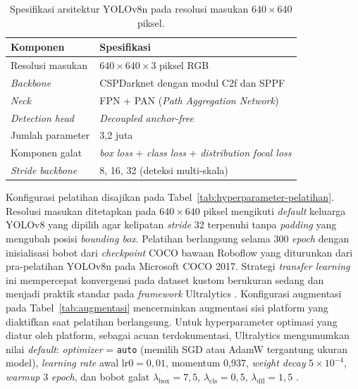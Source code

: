 \begin{table}[H]
\centering
\caption{Spesifikasi arsitektur YOLOv8n pada resolusi masukan $640 \times 640$ piksel.}
\label{tab:arsitektur-yolov8n}
\begin{tabular}{ll}
\hline
\textbf{Komponen} & \textbf{Spesifikasi} \\
\hline
Resolusi masukan       & $640 \times 640 \times 3$ piksel RGB \\
\textit{Backbone}      & CSPDarknet dengan modul C2f dan SPPF \\
\textit{Neck}          & FPN + PAN (\textit{Path Aggregation Network}) \\
\textit{Detection head} & \textit{Decoupled anchor-free} \\
Jumlah parameter       & 3,2 juta \\
Komponen galat         & \textit{box loss} + \textit{class loss} + \textit{distribution focal loss} \\
\textit{Stride backbone} & 8, 16, 32 (deteksi multi-skala) \\
\hline
\end{tabular}
\end{table}


Konfigurasi pelatihan disajikan pada Tabel~\ref{tab:hyperparameter-pelatihan}. Resolusi masukan ditetapkan pada $640 \times 640$ piksel mengikuti \textit{default} keluarga YOLOv8 yang dipilih agar kelipatan \textit{stride} 32 terpenuhi tanpa \textit{padding} yang mengubah posisi \textit{bounding box}. Pelatihan berlangsung selama 300 \textit{epoch} dengan inisialisasi bobot dari \textit{checkpoint} COCO bawaan Roboflow yang diturunkan dari pra-pelatihan YOLOv8n pada Microsoft COCO 2017. Strategi \textit{transfer learning} ini mempercepat konvergensi pada dataset kustom berukuran sedang dan menjadi praktik standar pada \textit{framework} Ultralytics \cite{ultralyticsDocs}. Konfigurasi augmentasi pada Tabel~\ref{tab:augmentasi} mencerminkan augmentasi sisi platform yang diaktifkan saat pelatihan berlangsung. Untuk hyperparameter optimasi yang diatur oleh platform, sebagai acuan terdokumentasi, Ultralytics mengumumkan nilai \textit{default}: \textit{optimizer} = \texttt{auto} (memilih SGD atau AdamW tergantung ukuran model), \textit{learning rate} awal $\text{lr0}=0{,}01$, momentum 0,937, \textit{weight decay} $5 \times 10^{-4}$, \textit{warmup} 3 \textit{epoch}, dan bobot galat $\lambda_{\text{box}}=7{,}5$, $\lambda_{\text{cls}}=0{,}5$, $\lambda_{\text{dfl}}=1{,}5$ \cite{ultralyticsCfg}.

